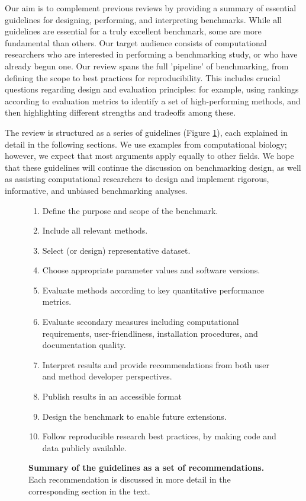Our aim is to complement previous reviews by providing a summary of essential guidelines for designing, performing, and interpreting benchmarks. While all guidelines are essential for a truly excellent benchmark, some are more fundamental than others. Our target audience consists of computational researchers who are interested in performing a benchmarking study, or who have already begun one. Our review spans the full 'pipeline' of benchmarking, from defining the scope to best practices for reproducibility. This includes crucial questions regarding design and evaluation principles: for example, using rankings according to evaluation metrics to identify a set of high-performing methods, and then highlighting different strengths and tradeoffs among these.

The review is structured as a series of guidelines (Figure \ref{fig:summary_guidelines}), each explained in detail in the following sections. We use examples from computational biology; however, we expect that most arguments apply equally to other fields. We hope that these guidelines will continue the discussion on benchmarking design, as well as assisting computational researchers to design and implement rigorous, informative, and unbiased benchmarking analyses.

\begin{figure}[htb!]
	\centering
	\begin{tcolorbox}
		\begin{enumerate}
			\item Define the purpose and scope of the benchmark.
			\item Include all relevant methods.
			\item Select (or design) representative dataset.
			\item Choose appropriate parameter values and software versions.
			\item Evaluate methods according to key quantitative performance metrics.
			\item Evaluate secondary measures including computational requirements, user-friendliness, installation procedures, and documentation quality.
			\item Interpret results and provide recommendations from both user and method developer perspectives.
			\item Publish results in an accessible format
			\item Design the benchmark to enable future extensions.
			\item Follow reproducible research best practices, by making code and data publicly available.
		\end{enumerate}
  \end{tcolorbox}
	\caption{\textbf{Summary of the guidelines as a set of recommendations.} Each recommendation is discussed in more detail in the corresponding section in the text.}
	\label{fig:summary_guidelines}
\end{figure}

